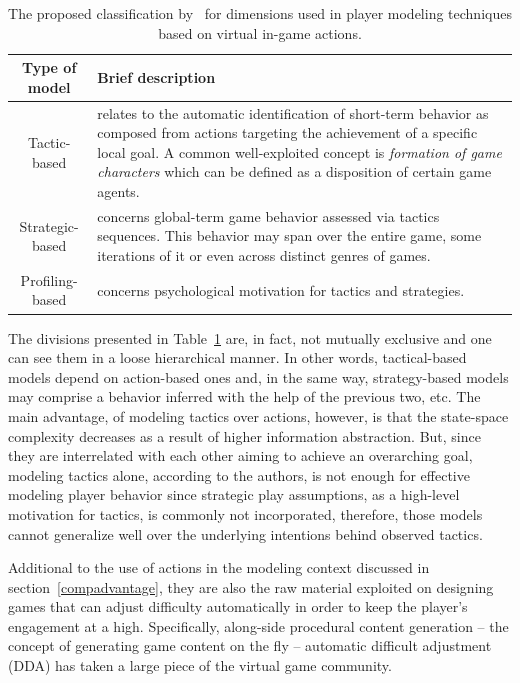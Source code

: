 \begin{table}[!ht]
\centering
\caption{The proposed classification by~\cite{bakkes2012player} for dimensions used in player modeling techniques based on virtual in-game actions.}
\label{actionModels}
\begin{tabularx}{\textwidth}{|c|X|} \hline
\textbf{Type of model}&\textbf{Brief description}\\ \hline
Tactic-based & relates to the automatic identification of short-term behavior as composed from actions targeting the achievement of a specific local goal. A common well-exploited concept is \textit{formation of game characters} which can be defined as a disposition of certain game agents.\\ \hline
Strategic-based & concerns global-term game behavior assessed via tactics sequences. This behavior may span over the entire game, some iterations of it or even across distinct genres of games.\\ \hline
Profiling-based & concerns psychological motivation for tactics and strategies.\\ \hline
\end{tabularx}
\end{table}

The divisions presented in Table~\ref{actionModels} are, in fact, not mutually exclusive and one can see them in a loose hierarchical manner. In other words, tactical-based models depend on action-based ones and, in the same way, strategy-based models may comprise a behavior inferred with the help of the previous two, etc. The main advantage, of modeling tactics over actions, however, is that the state-space complexity decreases as a result of higher information abstraction. But, since they are interrelated with each other aiming to achieve an overarching goal, modeling tactics alone, according to the authors, is not enough for effective modeling player behavior since strategic play assumptions, as a high-level motivation for tactics, is commonly not incorporated, therefore, those models cannot generalize well over the underlying intentions behind observed tactics.

Additional to the use of actions in the modeling context discussed in section~\ref{compadvantage}, they are also the raw material exploited on designing games that can adjust difficulty automatically in order to keep the player's engagement at a high. Specifically, along-side procedural content generation -- the concept of generating game content on the fly -- automatic difficult adjustment (DDA) has taken a large piece of the virtual game community.

